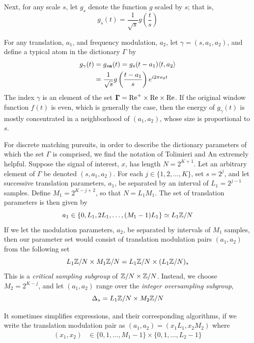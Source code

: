 Next, for any scale $s$, let $g_s$ denote the function $g$ scaled by 
$s$; that is,
\[
g_s(t) = \frac{1}{\sqrt{s}}g\left(\frac{t}{s}\right)
\]

For any translation, $a_1$, and frequency modulation, $a_2$, 
let $\gamma = (s, a_1, a_2)$, and define a typical atom in
the dictionary $\Gamma$ by
\begin{align*}%
g_\gamma(t) &= g_{s\a}(t) = g_s(t-a_1)\langle t,a_2 \rangle\\
&= \frac{1}{\sqrt{s}}g\left(\frac{t-a_1}{s}\right) e^{i2\pi a_2 t}
\end{align*}
The index $\gamma$ is an element of the set 
$\mathbf{\Gamma} = \mbox{Re}^+ \times \mbox{Re} \times \mbox{Re}$.  
If the original window function $f(t)$ is even, which is generally the case,
then the energy of $g_\gamma(t)$ %
is mostly concentrated in a neighborhood of $(a_1,a_2)$, whose size is proportional
to $s$.   

For discrete matching pursuits, in order to describe the dictionary parameters
of which the set $\Gamma$ is comprised, we find the notation of
Tolimieri and An \citeyear{Tolimieri:1998} extremely helpful.  Suppose the signal
of interest, $x$, has length $N = 2^{K+1}$.  Let an arbitrary element of
$\Gamma$ be denoted $(s,a_1,a_2)$.
For each $j \in \{1,2,\ldots,K\}$, set $s = 2^j$, and 
let successive translation parameters, $a_1$, be
separated by an interval of $L_1 = 2^{j-1}$ samples.  Define $M_1=2^{K-j+2}$,
so that $N = L_1M_1$.  The set of translation parameters is then given by
\[
a_1 \in \{0, L_1, 2L_1, \ldots, (M_1-1)L_1\} \simeq L_1\mathbb{Z}/N
\]
If we let the modulation parameters, $a_2$, be separated by intervals of 
$M_1$ samples, then our parameter set would consist of translation modulation
pairs $(a_1,a_2)$ from the following set  
\[
L_1\mathbb{Z}/N \times M_1\mathbb{Z}/N = L_1\mathbb{Z}/N \times (L_1\mathbb{Z}/N)_*
\]
This is a \emph{critical sampling subgroup} of $\mathbb{Z}/N \times \mathbb{Z}/N$.  Instead,
we choose $M_2= 2^{K-j}$, and let $(a_1,a_2)$ range over the 
\emph{integer oversampling subgroup},
\[
\Delta_s = L_1\mathbb{Z}/N \times M_2\mathbb{Z}/N
\]

It sometimes simplifies expressions, and their corresponding algorithms, if we
write the translation modulation pair as $(a_1,a_2) = (x_1L_1,x_2M_2)$ where  
\begin{align*}
(x_1,x_2) &\in \{0,1,\ldots,M_1-1\} \times \{0,1,\ldots,L_2-1\}%
\end{align*}

